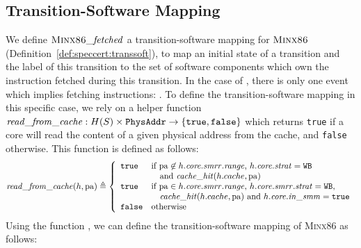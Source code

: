 \subsection{Transition-Software Mapping}
\label{subsec:minx86:fetched}

We define \(\textsc{Minx86}\mathit{\_fetched}\) a transition-software mapping for
$\textsc{Minx86}$ (Definition~\ref{def:speccert:transsoft}), to map an
initial state of a transition and the label of this transition to the set of
software components which own the instruction fetched during this transition.
%
In the case of , there is only one event which implies
fetching instructions: .
%
To define the transition-software mapping in this specific case, we rely on a
helper function
\( \mathit{read\_from\_cache} : H(S) \times \texttt{PhysAddr} \rightarrow \{
\texttt{true}, \texttt{false} \} \) which returns \texttt{true} if a core will
read the content of a given physical address from the cache, and \texttt{false}
otherwise.
%
This function is defined as follows:
%
\[
  \mathit{read\_from\_cache}(h, \mathrm{pa}) \triangleq \left\{
    \begin{array}{ll}
      \texttt{true} & \text{if }\mathrm{pa} \not\in
                      h.\mathit{core}.\mathit{smrr}.\mathit{range}\text{, }
                      h.\mathit{core}.\mathit{strat} = \texttt{WB} \\
                    & \quad\text{and } \mathit{cache\_hit}(h.cache, \mathrm{pa}) \\
      \texttt{true} & \text{if }\mathrm{pa} \in
                      h.\mathit{core}.\mathit{smrr}.\mathit{range}\text{, }
                      h.\mathit{core}.\mathit{smrr}.\mathit{strat} = \texttt{WB}, \\
                    & \quad \mathit{cache\_hit}(h.cache, \mathrm{pa}) \text{ and } h.\mathit{core}.\mathit{in\_smm} =
                      \texttt{true} \\
      \texttt{false} & \text{otherwise}
    \end{array}
  \right.
\]
%
Using the function , we can define the
transition-software mapping of {\scshape Minx86} as follows:
%
